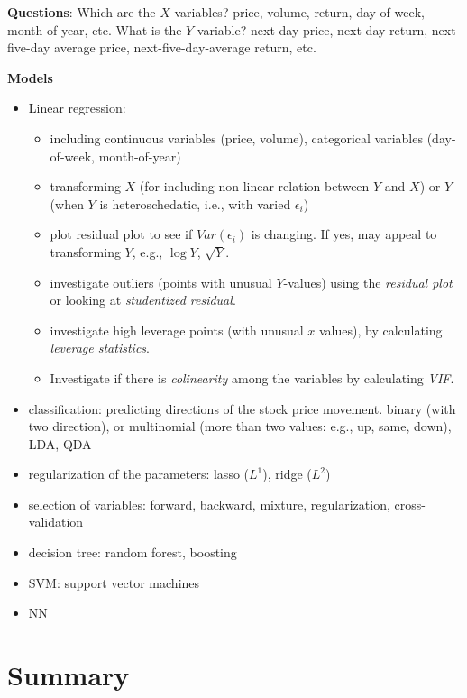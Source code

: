 \documentclass[
  letterpaper,
  DIV=11,
  numbers=noendperiod]{scrreprt}
\providecommand{\tightlist}{%
  \setlength{\itemsep}{0pt}\setlength{\parskip}{0pt}}\usepackage{longtable,booktabs,array}
\begin{document}
\textbf{Questions}: Which are the \(X\) variables? price, volume,
return, day of week, month of year, etc. What is the \(Y\) variable?
next-day price, next-day return, next-five-day average price,
next-five-day-average return, etc.

\textbf{Models}

\begin{itemize}
\item
  Linear regression:

  \begin{itemize}
  \tightlist
  \item
    including continuous variables (price, volume), categorical
    variables (day-of-week, month-of-year)
  \item
    transforming \(X\) (for including non-linear relation between \(Y\)
    and \(X\)) or \(Y\) (when \(Y\) is heteroschedatic, i.e., with
    varied \(\epsilon_i\))
  \item
    plot residual plot to see if \(Var(\epsilon_i)\) is changing. If
    yes, may appeal to transforming \(Y\), e.g., \(\log Y\),
    \(\sqrt{Y}\).
  \item
    investigate outliers (points with unusual \(Y\)-values) using the
    \emph{residual plot} or looking at \emph{studentized residual}.
  \item
    investigate high leverage points (with unusual \(x\) values), by
    calculating \emph{leverage statistics}.
  \item
    Investigate if there is \emph{colinearity} among the variables by
    calculating \emph{VIF}.
  \end{itemize}
\item
  classification: predicting directions of the stock price movement.
  binary (with two direction), or multinomial (more than two values:
  e.g., up, same, down), LDA, QDA
\item
  regularization of the parameters: lasso (\(L^1\)), ridge (\(L^2\))
\item
  selection of variables: forward, backward, mixture, regularization,
  cross-validation
\item
  decision tree: random forest, boosting
\item
  SVM: support vector machines
\item
  NN
\end{itemize}


\chapter{Summary}\label{summary}
\end{document}
